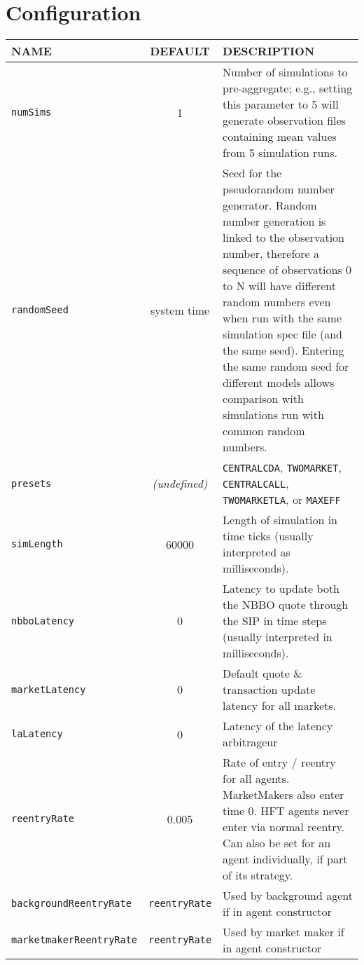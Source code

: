 \documentclass[11pt]{article}
\begin{document}
\section{Configuration}

\begin{table}
\centering
\begin{tabular}[f]{p{} c p{}}
\uppercase{Name}   & \uppercase{Default} & \uppercase{Description} \\ \hline

\texttt{numSims} 		& 1 & Number of simulations to pre-aggregate; e.g., setting this parameter to 5 will generate observation files containing mean values from 5 simulation runs. \\
\texttt{randomSeed} 	& system time & Seed for the pseudorandom number generator. Random number generation is linked to the observation number, therefore a sequence of observations 0 to N will have different random numbers even when run with the same simulation spec file (and the same seed). Entering the same random seed for different models allows comparison with simulations run with common random numbers. \\
\texttt{presets}  		& \emph{(undefined)} & \texttt{CENTRALCDA},
\texttt{TWOMARKET}, \texttt{CENTRALCALL}, \texttt{TWOMARKETLA}, or \texttt{MAXEFF} \\

\texttt{simLength} 	& 60000 & Length of simulation in time ticks (usually interpreted as milliseconds). \\ 
\texttt{nbboLatency} 	& 0 & Latency to update both the NBBO quote through the SIP in time steps (usually interpreted in milliseconds).\\
\texttt{marketLatency} 	& 0 & Default quote \& transaction update latency for
all markets. \\
\texttt{laLatency} 	& 0 & Latency of the latency arbitrageur \\


\texttt{reentryRate} 	& 0.005 & Rate of entry / reentry for all
agents. MarketMakers also enter time 0. HFT agents never enter via normal
reentry. Can also be set for an agent individually, if part of its strategy.\\
\texttt{backgroundReentryRate} & \texttt{reentryRate} & Used by background agent if in agent constructor \\
\texttt{marketmakerReentryRate} & \texttt{reentryRate} & Used by market maker if in agent constructor \\


\end{tabular}
\end{table}
\end{document}
